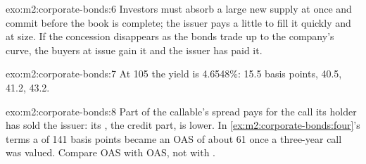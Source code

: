\begin{solution}{exo:m2:corporate-bonds:6}
Investors must absorb a large new supply at once and commit before the book is
complete; the issuer pays a little to fill it quickly and at size. If the concession
disappears as the bonds trade up to the company's curve, the buyers at issue gain it
and the issuer has paid it.
\end{solution}

\begin{solution}{exo:m2:corporate-bonds:7}
At 105 the yield is 4.6548\%:  15.5 basis points,  40.5,  41.2,
 43.2.
\end{solution}

\begin{solution}{exo:m2:corporate-bonds:8}
Part of the callable's spread pays for the call its holder has sold the issuer: its
, the credit part, is lower. In
\cref{ex:m2:corporate-bonds:four}'s terms a  of 141 basis points became an OAS
of about 61 once a three-year call was valued. Compare OAS with OAS, not  with
.
\end{solution}

